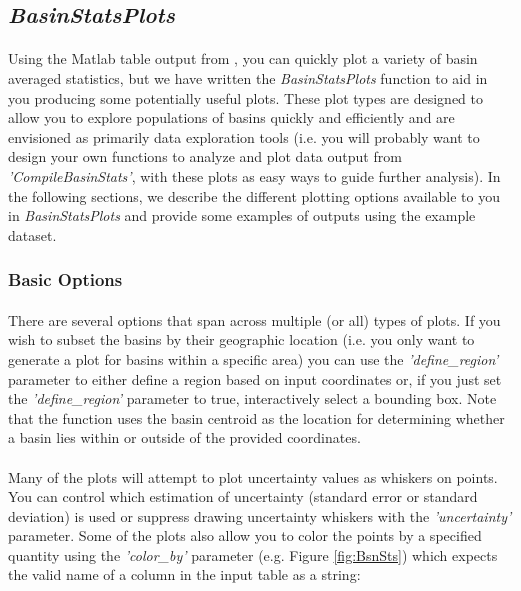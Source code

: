 \subsection{\textit{BasinStatsPlots}} \label{sec:BSPlots}
\paragraph{}Using the Matlab table output from , you can quickly plot a variety of basin averaged statistics, but we have written the \textit{BasinStatsPlots} function to aid in you producing some potentially useful plots. These plot types are designed to allow you to explore populations of basins quickly and efficiently and are envisioned as primarily data exploration tools (i.e. you will probably want to design your own functions to analyze and plot data output from \textit{'CompileBasinStats'}, with these plots as easy ways to guide further analysis). In the following sections, we describe the different plotting options available to you in \textit{BasinStatsPlots} and provide some examples of outputs using the example dataset.

\subsubsection{Basic Options}
\paragraph{}There are several options that span across multiple (or all) types of plots. If you wish to subset the basins by their geographic location (i.e. you only want to generate a plot for basins within a specific area) you can use the \textit{'define\_region'} parameter to either define a region based on input coordinates or, if you just set the \textit{'define\_region'} parameter to true, interactively select a bounding box. Note that the function uses the basin centroid as the location for determining whether a basin lies within or outside of the provided coordinates.

\paragraph{}Many of the plots will attempt to plot uncertainty values as whiskers on points. You can control which estimation of uncertainty (standard error or standard deviation) is used or suppress drawing uncertainty whiskers with the \textit{'uncertainty'} parameter.  Some of the plots also allow you to color the points by a specified quantity using the \textit{'color\_by'} parameter (e.g. Figure \ref{fig:BsnSts}) which expects the valid name of a column in the input table as a string:

